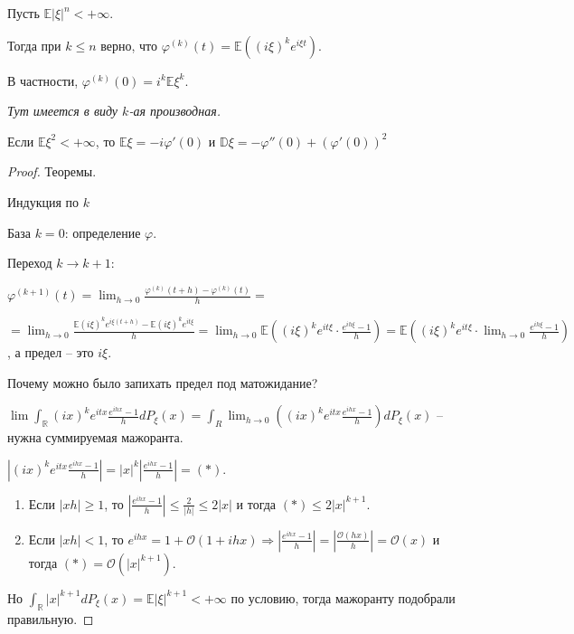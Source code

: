 \begin{theorem}
    Пусть $\mathbb{E} |\xi|^n < +\infty$.

    Тогда при $k \leqslant n$ верно, что $\varphi^{(k)} (t) = \mathbb{E} ((i\xi)^k e^{i\xi t}) $.

    В частности, $\varphi^{(k)} (0) = i^k \mathbb{E} \xi^k$.

    \textit{Тут имеется в виду $k$-ая производная.}
\end{theorem}

\begin{consequence}
    Если $\mathbb{E} \xi^2 < + \infty$, то $\mathbb{E} \xi = -i \varphi'(0)$ и $\mathbb{D} \xi = -\varphi''(0) + (\varphi'(0))^2$
\end{consequence}

\begin{proof}
    Теоремы.

    Индукция по $k$

    База $k = 0$: определение $\varphi$.

    Переход $k \to k + 1$:

    $\varphi^{(k + 1)}(t) = \lim_{h \to 0} \frac{\varphi^{(k)}(t + h) - \varphi^{(k)}(t)}{h} = $

    $= \lim_{h \to 0} \frac{\mathbb{E} (i \xi)^k e^{i\xi(t + h)} - \mathbb{E} (i \xi)^k e^{it\xi}}{h} =
    \lim_{h \to 0} \mathbb{E} ((i \xi)^k e^{i t \xi} \cdot \frac{e^{ih\xi} - 1}{h}) = \mathbb{E} ((i\xi)^k e^{i t \xi} \cdot \lim_{h \to 0} \frac{e^{i h \xi} - 1}{h})$, а предел -- это $i \xi$.

    Почему можно было запихать предел под матожидание?

    $\lim \int_{\mathbb{R}} (ix)^k e^{itx} \frac{e^{ihx} - 1}{h} d P_{\xi}(x) = \int_{R} \lim_{h \to 0} ((ix)^k e^{itx} \frac{e^{ihx} - 1}{h}) d P_{\xi}(x)$ -- нужна суммируемая мажоранта.

    $\left | (ix)^k e^{itx} \frac{e^{ihx} - 1}{h}  \right | = |x|^k \left | \frac{e^{ihx} - 1}{h} \right | = (*)$.

    \begin{enumerate}
        \item {
            Если $|xh| \geqslant 1$, то $\left | \frac{e^{ihx} - 1}{h} \right | \leqslant \frac{2}{|h|} \leqslant 2|x| $ и тогда $(*) \leq 2|x|^{k + 1}$.
        }
        \item {
            Если $|xh| < 1$, то $e^{ihx} = 1 + \mathcal{O}(1 + ihx) \Rightarrow \left | \frac{e^{ihx} - 1}{h}  \right | = \left | \frac{\mathcal{O}(hx)}{h}  \right | = \mathcal{O}(x)$ и тогда $(*) = \mathcal{O}(|x|^{k + 1})$.
        }
    \end{enumerate}

    Но $\int_{\mathbb{R}} |x|^{k + 1} d P_{\xi} (x) = \mathbb{E} |\xi|^{k + 1} < +\infty$ по условию, тогда мажоранту подобрали правильную.
\end{proof}

